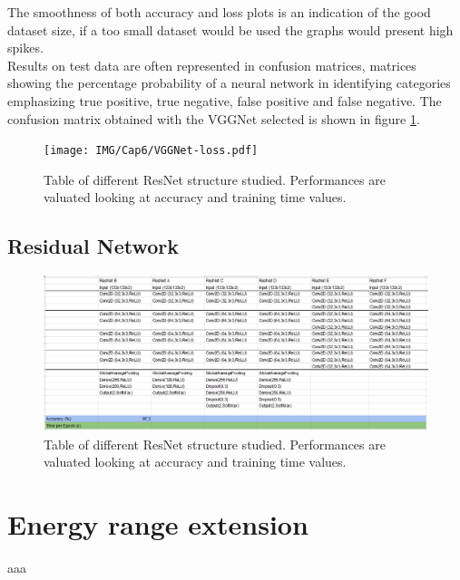 The smoothness of both accuracy and loss plots is an indication of the good dataset size, if a too small dataset would be used the graphs would present high spikes.\\

Results on test data are often represented in confusion matrices, matrices showing the percentage probability of a neural network in identifying categories emphasizing true positive, true negative, false positive and false negative. The confusion matrix obtained with the VGGNet selected is shown in figure \ref{fig:VGGNet-cm}.

\begin{figure}
	\centering
	\texttt{[image: IMG/Cap6/VGGNet-loss.pdf]}
	\caption{Table of different ResNet structure studied. Performances are valuated looking at accuracy and training time values.}
	\label{fig:VGGNet-cm}
\end{figure}

\subsection{Residual Network}

\begin{figure}
	\centering
	\includegraphics[width=1.\textwidth]{IMG/Cap6/ResNet-Tab.png}
	\caption{Table of different ResNet structure studied. Performances are valuated looking at accuracy and training time values.}
	\label{fig:ResNet-tested}
\end{figure}

\section{Energy range extension}
aaa